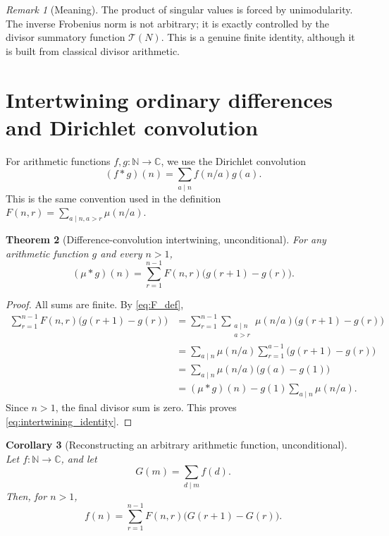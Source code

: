 \documentclass[11pt]{amsart}
\numberwithin{equation}{section}
\theoremstyle{plain}
\newtheorem{theorem}{Theorem}[section]
\newtheorem{corollary}[theorem]{Corollary}
\theoremstyle{definition}
\theoremstyle{remark}
\newtheorem{remark}[theorem]{Remark}
\newcommand{\N}{\mathbb N}
\newcommand{\C}{\mathbb C}
\newcommand{\mob}{\mu}
\newcommand{\Fsurf}{F}
\newcommand{\TauSum}{\mathcal T}
\begin{document}
\begin{remark}[Meaning]
\label{rem:frobenius_meaning}
The product of singular values is forced by unimodularity.  The inverse Frobenius norm is not arbitrary; it is exactly controlled by the divisor summatory function \(\TauSum(N)\).  This is a genuine finite identity, although it is built from classical divisor arithmetic.
\end{remark}

\section{Intertwining ordinary differences and Dirichlet convolution}
\label{sec:intertwining}

For arithmetic functions \(f,g:\N\to\C\), we use the Dirichlet convolution
\begin{equation}
(f*g)(n)=\sum_{a\mid n}f(n/a)g(a).
\label{eq:dirichlet_convolution_convention}
\end{equation}
This is the same convention used in the definition \(\Fsurf(n,r)=\sum_{a\mid n,a>r}\mob(n/a)\).

\begin{theorem}[Difference-convolution intertwining, unconditional]
\label{thm:intertwining}
For any arithmetic function \(g\) and every \(n>1\),
\begin{equation}
(\mob*g)(n)=\sum_{r=1}^{n-1}\Fsurf(n,r)\bigl(g(r+1)-g(r)\bigr).
\label{eq:intertwining_identity}
\end{equation}
\end{theorem}

\begin{proof}
All sums are finite.  By \eqref{eq:F_def},
\begin{align}
\sum_{r=1}^{n-1}\Fsurf(n,r)\bigl(g(r+1)-g(r)\bigr)
&=\sum_{r=1}^{n-1}\sum_{\substack{a\mid n\\a>r}}\mob(n/a)\bigl(g(r+1)-g(r)\bigr) \\
&=\sum_{a\mid n}\mob(n/a)\sum_{r=1}^{a-1}\bigl(g(r+1)-g(r)\bigr) \\
&=\sum_{a\mid n}\mob(n/a)\bigl(g(a)-g(1)\bigr) \\
&=(\mob*g)(n)-g(1)\sum_{a\mid n}\mob(n/a).
\label{eq:intertwining_proof}
\end{align}
Since \(n>1\), the final divisor sum is zero.  This proves \eqref{eq:intertwining_identity}.
\end{proof}

\begin{corollary}[Reconstructing an arbitrary arithmetic function, unconditional]
\label{cor:reconstruct_function}
Let \(f:\N\to\C\), and let
\begin{equation}
G(m)=\sum_{d\mid m}f(d).
\label{eq:G_sum_divisors}
\end{equation}
Then, for \(n>1\),
\begin{equation}
f(n)=\sum_{r=1}^{n-1}\Fsurf(n,r)\bigl(G(r+1)-G(r)\bigr).
\label{eq:reconstruct_f}
\end{equation}
\end{corollary}
\end{document}
